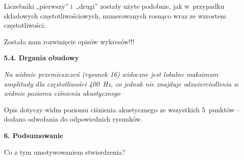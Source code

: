 \documentclass[12pt]{article}
\begin{document}
    Liczebniki „pierwszy” i~„drugi” zostały użyte podobnie, jak w~przypadku składowych częstotliwościowych, numerowanych rosnąco wraz ze wzrostem częstotliwości.
    
    Zostało nam rozwinięcie opisów wykresów!!!
    
    \textbf{5.4. Drgania obudowy}
    
    \textit{Na widmie przemieszczeń (rysunek 16) widoczne jest lokalne maksimum amplitudy dla częstotliwości 400~Hz, co jednak nie znajduje odzwierciedlenia w widmie poziomu ciśnienia akustycznego}
    
    Opis dotyczy widm poziomu ciśnienia akustycznego ze wszystkich 5~punktów -- dodano odwołania do odpowiednich rysunków.
    
    \textbf{6. Podsumowanie}
    
    Co z tym umotywowaniem stwierdzenia?
    
    
\end{document}
